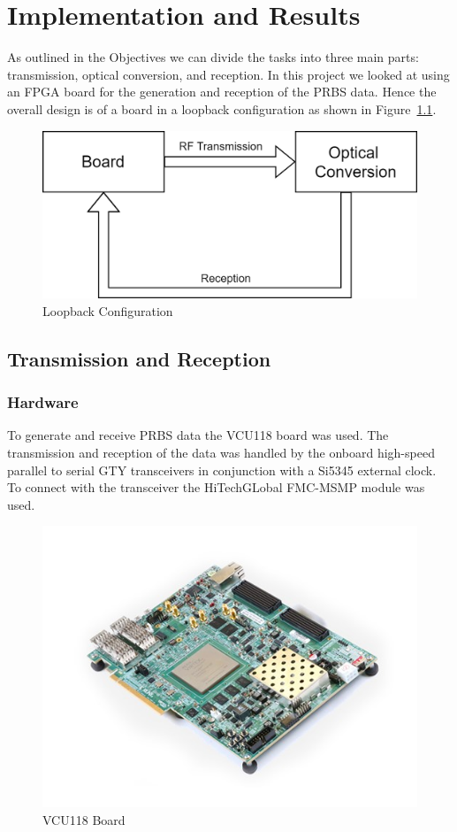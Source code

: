 \chapter{Implementation and Results}
As outlined in the Objectives we can divide the tasks into three main parts:
transmission, optical conversion, and reception.  In this project we looked at
using an FPGA board for the generation and reception of the PRBS data.  Hence
the overall design is of a board in a loopback configuration as shown in
Figure~\ref{fig:loopback}.

\begin{figure}[ht]
    \centering
    \includegraphics[width=0.5\linewidth]{img/loopback.png}
    \caption{Loopback Configuration}%
    \label{fig:loopback}
\end{figure}

\section{Transmission and Reception}%
\label{sec:transmission_and_reception}

\subsection{Hardware}%
\label{sub:hardware}
To generate and receive PRBS data the VCU118 board was used. The transmission
and reception of the data was handled by the onboard high-speed parallel to
serial GTY transceivers in conjunction with a Si5345 external clock. To connect
with the transceiver the HiTechGLobal FMC-MSMP module was used.
\begin{figure}[ht]
    \centering
    \includegraphics[width=0.5\linewidth]{img/board.jpg}
    \caption{VCU118 Board}%
    \label{fig:board}
\end{figure}

